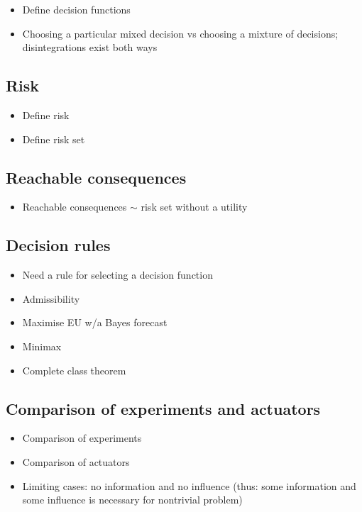 \begin{itemize}
    \item Define decision functions
    \item Choosing a particular mixed decision vs choosing a mixture of decisions; disintegrations exist both ways
\end{itemize}

\subsection{Risk}

\begin{itemize}
    \item Define risk
    \item Define risk set
\end{itemize}

\subsection{Reachable consequences}

\begin{itemize}
    \item Reachable consequences $\sim$ risk set without a utility
\end{itemize}

\subsection{Decision rules}

\begin{itemize}
    \item Need a rule for selecting a decision function
    \item Admissibility
    \item Maximise EU w/a Bayes forecast
    \item Minimax
    \item Complete class theorem
\end{itemize}

\subsection{Comparison of experiments and actuators}

\begin{itemize}
    \item Comparison of experiments
    \item Comparison of actuators
    \item Limiting cases: no information and no influence (thus: some information and some influence is necessary for nontrivial problem)
\end{itemize}


